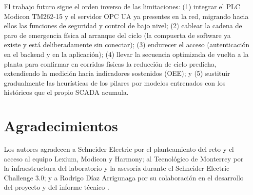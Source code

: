 \documentclass{styles/svproc}
\begin{document}
El trabajo futuro sigue el orden inverso de las limitaciones: (1) integrar
el PLC Modicon TM262-15 y el servidor OPC UA \cite{iec62541} ya presentes en
la red, migrando hacia ellos las funciones de seguridad y control de bajo
nivel; (2) cablear la cadena de paro de emergencia física al arranque del
ciclo (la compuerta de software ya existe y está deliberadamente sin
conectar); (3) endurecer el acceso (autenticación en el backend y en la
aplicación); (4) llevar la secuencia optimizada de vuelta a la planta para
confirmar en corridas físicas la reducción de ciclo predicha, extendiendo
la medición hacia indicadores sostenidos (OEE); y (5)
sustituir gradualmente las heurísticas de los pilares por modelos entrenados
con los históricos que el propio SCADA acumula.

\section*{Agradecimientos}
Los autores agradecen a Schneider Electric por el planteamiento del reto y
el acceso al equipo Lexium, Modicon y Harmony; al Tecnológico de Monterrey
por la infraestructura del laboratorio y la asesoría durante el
Schneider Electric Challenge 3.0; y a Rodrigo Díaz Arrigunaga por su
colaboración en el desarrollo del proyecto y del informe técnico
\cite{informe2026}.



\end{document}
